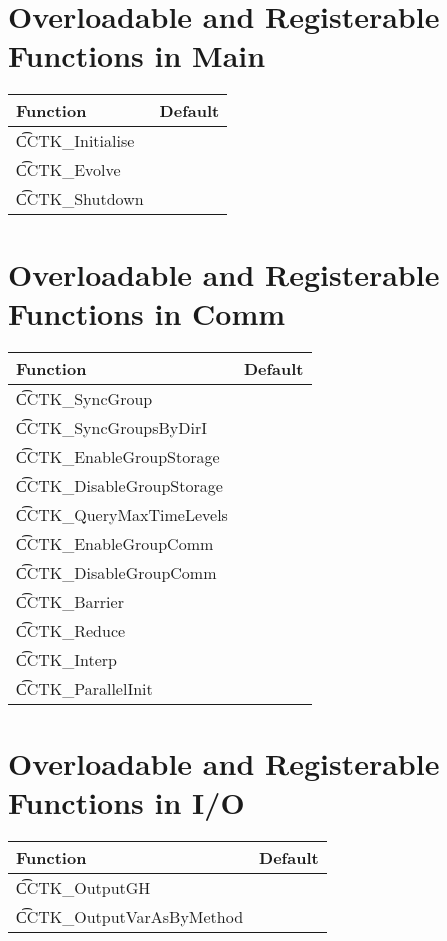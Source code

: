 \section{Overloadable and Registerable Functions in Main}

 \begin{tabular}{|l|l|}
   \hline  {\bf Function} & {\bf Default} \\
   \hline {\t CCTK\_Initialise}           &\\
   \hline {\t CCTK\_Evolve}               &\\
   \hline {\t CCTK\_Shutdown}             &\\
   \hline
 \end{tabular}

\section{Overloadable and Registerable Functions in Comm}

  \begin{tabular}{|l|l|}
   \hline {\bf Function} & {\bf Default}  \\
   \hline {\t CCTK\_SyncGroup}           &\\
   \hline {\t CCTK\_SyncGroupsByDirI}    &\\
   \hline {\t CCTK\_EnableGroupStorage}  &\\
   \hline {\t CCTK\_DisableGroupStorage} &\\
   \hline {\t CCTK\_QueryMaxTimeLevels}  &\\
   \hline {\t CCTK\_EnableGroupComm}     &\\
   \hline {\t CCTK\_DisableGroupComm}    &\\
   \hline {\t CCTK\_Barrier}             &\\
   \hline {\t CCTK\_Reduce}              &\\
   \hline {\t CCTK\_Interp}              &\\
   \hline {\t CCTK\_ParallelInit}        &\\
   \hline
  \end{tabular}

\section{Overloadable and Registerable Functions in I/O}

 \begin{tabular}{|l|l|}
   \hline {\bf Function} & {\bf Default}   \\
   \hline {\t CCTK\_OutputGH}            & \\
   \hline {\t CCTK\_OutputVarAsByMethod} & \\
   \hline
 \end{tabular}

